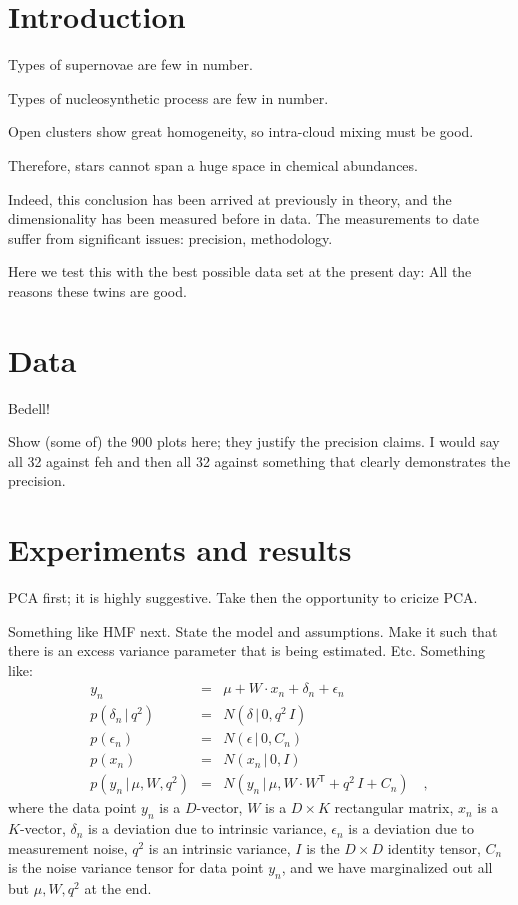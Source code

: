 \documentclass[12pt]{article}
\newcommand{\given}{\,|\,}
\newcommand{\trans}[1]{{#1}^{\!\mathsf{T}}}
\begin{document}
\section{Introduction}

Types of supernovae are few in number.

Types of nucleosynthetic process are few in number.

Open clusters show great homogeneity, so intra-cloud mixing must be good.

Therefore, stars cannot span a huge space in chemical abundances.

Indeed, this conclusion has been arrived at previously in theory, and
the dimensionality has been measured before in data. The measurements to
date suffer from significant issues: precision, methodology.

Here we test this with the best possible data set at the present day:
All the reasons these twins are good.

\section{Data}

Bedell!

Show (some of) the 900 plots here; they justify the precision claims.
I would say all 32 against feh and then all 32 against something that
clearly demonstrates the precision.

\section{Experiments and results}

PCA first; it is highly suggestive. Take then the opportunity to cricize PCA.

Something like HMF next. State the model and assumptions. Make it such that
there is an excess variance parameter that is being estimated. Etc.
Something like:
\begin{eqnarray}
y_n &=& \mu + W\cdot x_n + \delta_n + \epsilon_n
\\
p(\delta_n\given q^2) &=& N(\delta\given 0, q^2\,I)
\\
p(\epsilon_n) &=& N(\epsilon\given 0, C_n)
\\
p(x_n) &=& N(x_n\given 0, I)
\\
p(y_n\given \mu,W,q^2) &=& N(y_n\given \mu, W\cdot\trans{W}+q^2\,I+C_n)
\quad ,
\end{eqnarray}
where the data point $y_n$ is a $D$-vector,
$W$ is a $D\times K$ rectangular matrix,
$x_n$ is a $K$-vector,
$\delta_n$ is a deviation due to intrinsic variance,
$\epsilon_n$ is a deviation due to measurement noise,
$q^2$ is an intrinsic variance,
$I$ is the $D\times D$ identity tensor,
$C_n$ is the noise variance tensor for data point $y_n$,
and we have marginalized out all but $\mu,W,q^2$ at the end.
\end{document}
